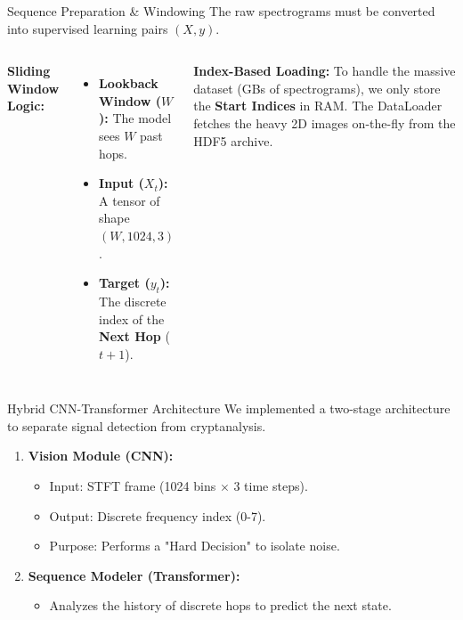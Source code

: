 \documentclass[aspectratio=169, 11pt]{beamer}
\begin{document}
\begin{frame}{Sequence Preparation \& Windowing}
    The raw spectrograms must be converted into supervised learning pairs $(X, y)$.
    \vspace{2mm}
    \begin{columns}
        \textbf{Sliding Window Logic:}
        \begin{itemize}
            \item \textbf{Lookback Window ($W$):} The model sees $W$ past hops.
            \item \textbf{Input ($X_t$):} A tensor of shape $(W, 1024, 3)$.
            \item \textbf{Target ($y_t$):} The discrete index of the \textbf{Next Hop} ($t+1$).
        \end{itemize}
        
        \vspace{1em}
        \textbf{Index-Based Loading:}
        To handle the massive dataset (GBs of spectrograms), we only store the \textbf{Start Indices} in RAM. The DataLoader fetches the heavy 2D images on-the-fly from the HDF5 archive.
        
        \centering
    \end{columns}
\end{frame}

\begin{frame}{Hybrid CNN-Transformer Architecture}
    We implemented a two-stage architecture to separate signal detection from cryptanalysis.
    
    \begin{enumerate}
        \item \textbf{Vision Module (CNN):} 
        \begin{itemize}
            \item Input: STFT frame (1024 bins $\times$ 3 time steps).
            \item Output: Discrete frequency index (0-7).
            \item Purpose: Performs a "Hard Decision" to isolate noise.
        \end{itemize}
        \item \textbf{Sequence Modeler (Transformer):}
        \begin{itemize}
            \item Analyzes the history of discrete hops to predict the next state.
        \end{itemize}
    \end{enumerate}
\end{frame}
\end{document}

